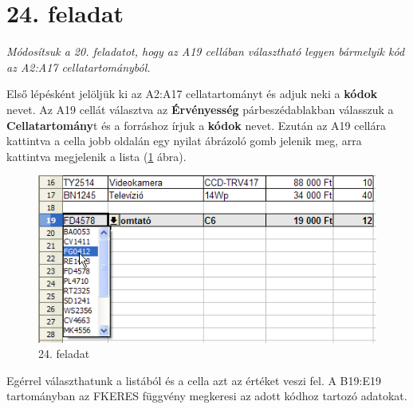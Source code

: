 \section{24. feladat}

{\itshape
Módosítsuk a 20. feladatot, hogy az A19 cellában választható
legyen bármelyik kód az A2:A17 cellatartományból.}

Első lépésként jelöljük ki az A2:A17 cellatartományt
és adjuk neki a \textbf{kódok} nevet. Az A19 cellát választva
az \textbf{Érvényesség} párbeszédablakban válasszuk a
\textbf{Cellatartomány}t és a forráshoz írjuk a
 \textbf{kódok} nevet. Ezután az A19 cellára kattintva a cella
jobb oldalán egy nyilat ábrázoló gomb jelenik meg, arra
kattintva megjelenik a lista (\ref{24-feladat} ábra).

\begin{figure}[!h]
\begin{center}
\includegraphics[width=12.751cm]{oocalcv2-img110.png}
\caption{24. feladat}\label{24-feladat}
\end{center}
\end{figure}

Egérrel választhatunk a listából és a cella azt az értéket
veszi fel. A B19:E19 tartományban az FKERES függvény megkeresi az
adott kódhoz tartozó adatokat.

